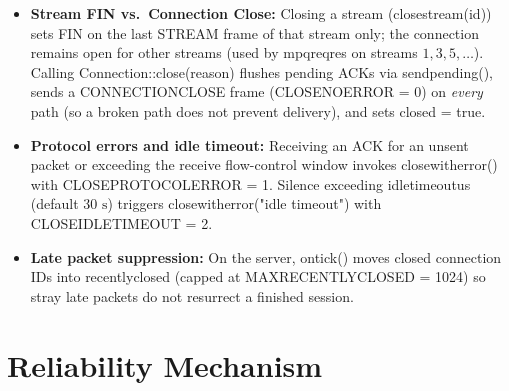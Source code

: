 \documentclass[10pt,a4paper]{article}
\newcommand{\codeul}{\textunderscore\hspace{0pt}}
\DeclareRobustCommand{\code}[1]{{\ttfamily\let\_\codeul #1}}
\begin{document}
\begin{itemize}
    \item \textbf{Stream FIN vs.\ Connection Close:} Closing a stream (\code{close\_stream(id)}) sets \code{FIN} on the last \code{STREAM} frame of that stream only; the connection remains open for other streams (used by \code{mpq\_reqres} on streams $1, 3, 5, \dots$). Calling \code{Connection::close(reason)} flushes pending ACKs via \code{send\_pending()}, sends a \code{CONNECTION\_CLOSE} frame (\code{CLOSE\_NO\_ERROR = 0}) on \emph{every} path (so a broken path does not prevent delivery), and sets \code{closed = true}.
    \item \textbf{Protocol errors and idle timeout:} Receiving an ACK for an unsent packet or exceeding the receive flow-control window invokes \code{close\_with\_error()} with \code{CLOSE\_PROTOCOL\_ERROR = 1}. Silence exceeding \code{idle\_timeout\_us} (default $30\text{ s}$) triggers \code{close\_with\_error("idle timeout")} with \code{CLOSE\_IDLE\_TIMEOUT = 2}.
    \item \textbf{Late packet suppression:} On the server, \code{on\_tick()} moves closed connection IDs into \code{recently\_closed} (capped at \code{MAX\_RECENTLY\_CLOSED = 1024}) so stray late packets do not resurrect a finished session.
\end{itemize}

\section{Reliability Mechanism}
\end{document}
